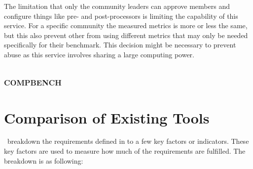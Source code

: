 The limitation that only the community leaders can approve members and configure things like pre- and post-processors is limiting the capability of this service.
For a specific community the measured metrics is more or less the same, but this also prevent other from using different metrics that may only be needed specifically for their benchmark.
This decision might be necessary to prevent abuse as this service involves sharing a large computing power.

\subsection{\textsc{compbench}}

\lipsum[1-2]


\section{Comparison of Existing Tools}

\First~breakdown the requirements defined in  to a few key factors or indicators.
These key factors are used to measure how much of the requirements are fulfilled.
The breakdown is as following:


